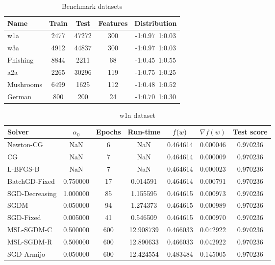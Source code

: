 \begin{table}
\centering
\caption{Benchmark datasets}
\label{tab:datasets}
\begin{tabular}{lSSSc}
\toprule
Name & {Train} & {Test} & {Features} & {Distribution} \\
\midrule
w1a & 2477 & 47272 & 300 & -1:$0.97$\,\,\,1:$0.03$ \\
w3a & 4912 & 44837 & 300 & -1:$0.97$\,\,\,1:$0.03$ \\
Phishing & 8844 & 2211 & 68 & -1:$0.45$\,\,\,1:$0.55$ \\
a2a & 2265 & 30296 & 119 & -1:$0.75$\,\,\,1:$0.25$ \\
Mushrooms & 6499 & 1625 & 112 & -1:$0.48$\,\,\,1:$0.52$ \\
German & 800 & 200 & 24 & -1:$0.70$\,\,\,1:$0.30$ \\
\bottomrule
\end{tabular}
\end{table}

\begin{table}
\centering
\caption{w1a dataset}
\label{tab:w1a-table}
\begin{tabular}{lS[round-precision=3]S[drop-zero-decimal]S[round-precision=4]S[round-precision=6]S[exponent-mode=scientific]S[round-precision=6]}
\toprule
Solver & {$\alpha_0$} & {Epochs} & {Run-time} & {$\operatorname*{\mathit{f}}(w)$} & {$\nabla f(w)$} & {Test score} \\
\midrule
Newton-CG & NaN & 6 & NaN & 0.464614 & 0.000046 & 0.970236 \\
CG & NaN & 7 & NaN & 0.464614 & 0.000009 & 0.970236 \\
L-BFGS-B & NaN & 7 & NaN & 0.464614 & 0.000023 & 0.970236 \\
BatchGD-Fixed & 0.750000 & 17 & 0.014591 & 0.464614 & 0.000791 & 0.970236 \\
SGD-Decreasing & 1.000000 & 85 & 1.155595 & 0.464615 & 0.000973 & 0.970236 \\
SGDM & 0.050000 & 94 & 1.274373 & 0.464615 & 0.000989 & 0.970236 \\
SGD-Fixed & 0.005000 & 41 & 0.546509 & 0.464615 & 0.000970 & 0.970236 \\
MSL-SGDM-C & 0.500000 & 600 & 12.908739 & 0.466033 & 0.042922 & 0.970236 \\
MSL-SGDM-R & 0.500000 & 600 & 12.890633 & 0.466033 & 0.042922 & 0.970236 \\
SGD-Armijo & 0.050000 & 600 & 12.424554 & 0.483484 & 0.145005 & 0.970236 \\
\bottomrule
\end{tabular}
\end{table}

